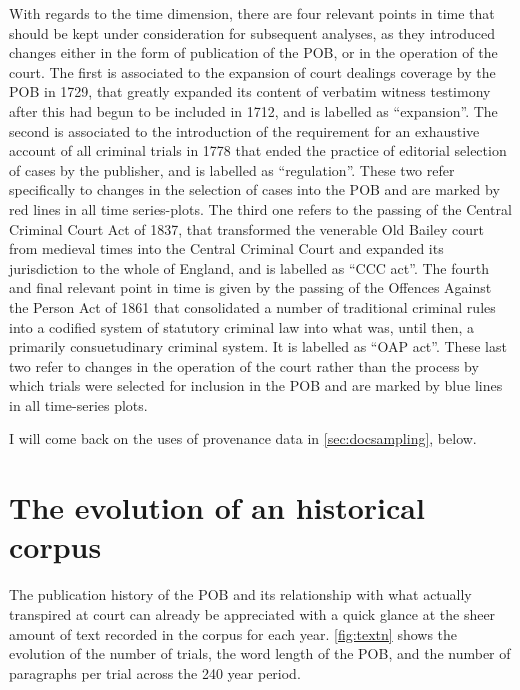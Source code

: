 With regards to the time dimension, there are four relevant points in time that should be kept under consideration for subsequent analyses, as they introduced changes either in the form of publication of the POB, or in the operation of the court.
The first is associated to the expansion of court dealings coverage by the POB in 1729, that greatly expanded its content of verbatim witness testimony after this had begun to be included in 1712, and is labelled as ``expansion''.
The second is associated to the introduction of the requirement for an exhaustive account of all criminal trials in 1778 that ended the practice of editorial selection of cases by the publisher, and is labelled as ``regulation''.
These two refer specifically to changes in the selection of cases into the POB and are marked by red lines in all time series-plots.
The third one refers to the passing of the Central Criminal Court Act of 1837, that transformed the venerable Old Bailey court from medieval times into the Central Criminal Court and expanded its jurisdiction to the whole of England, and is labelled as ``CCC act''.
The fourth and final relevant point in time is given by the passing of the Offences Against the Person Act of 1861 that consolidated a number of traditional criminal rules into a codified system of statutory criminal law into what was, until then, a primarily consuetudinary criminal system. It is labelled as ``OAP act''.
These last two refer to changes in the operation of the court rather than the process by which trials were selected for inclusion in the POB and are marked by blue lines in all time-series plots.

I will come back on the uses of provenance data in \autoref{sec:docsampling}, below.

\section{The evolution of an historical corpus}
\label{sec:lexstats}

The publication history of the POB and its relationship with what actually transpired at court can already be appreciated with a quick glance at the sheer amount of text recorded in the corpus for each year.
\autoref{fig:textn} shows the evolution of the number of trials, the word length of the POB, and the number of paragraphs per trial across the 240 year period.

%     

